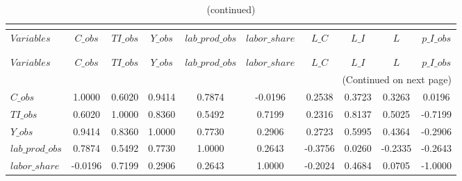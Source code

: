  
\begin{center}
\begin{longtable}{lccccccccc} 
\caption{MATRIX OF CORRELATIONS}\\
 \label{Table:th_corr_matrix}\\
\toprule 
$Variables       $	 & 	 $           C\_obs$	 & 	 $          TI\_obs$	 & 	 $           Y\_obs$	 & 	 $  lab\_prod\_obs$	 & 	 $     labor\_share$	 & 	 $             L\_C$	 & 	 $             L\_I$	 & 	 $                 L$	 & 	 $       p\_I\_obs$\\
\midrule \endfirsthead 
\caption{(continued)}\\
 \toprule \\ 
$Variables       $	 & 	 $           C\_obs$	 & 	 $          TI\_obs$	 & 	 $           Y\_obs$	 & 	 $  lab\_prod\_obs$	 & 	 $     labor\_share$	 & 	 $             L\_C$	 & 	 $             L\_I$	 & 	 $                 L$	 & 	 $       p\_I\_obs$\\
\midrule \endhead 
\midrule \multicolumn{10}{r}{(Continued on next page)} \\ \bottomrule \endfoot 
\bottomrule \endlastfoot 
$C\_obs          $	 & 	            1.0000	 & 	            0.6020	 & 	            0.9414	 & 	            0.7874	 & 	           -0.0196	 & 	            0.2538	 & 	            0.3723	 & 	            0.3263	 & 	            0.0196 \\ 
$TI\_obs         $	 & 	            0.6020	 & 	            1.0000	 & 	            0.8360	 & 	            0.5492	 & 	            0.7199	 & 	            0.2316	 & 	            0.8137	 & 	            0.5025	 & 	           -0.7199 \\ 
$Y\_obs          $	 & 	            0.9414	 & 	            0.8360	 & 	            1.0000	 & 	            0.7730	 & 	            0.2906	 & 	            0.2723	 & 	            0.5995	 & 	            0.4364	 & 	           -0.2906 \\ 
$lab\_prod\_obs  $	 & 	            0.7874	 & 	            0.5492	 & 	            0.7730	 & 	            1.0000	 & 	            0.2643	 & 	           -0.3756	 & 	            0.0260	 & 	           -0.2335	 & 	           -0.2643 \\ 
$labor\_share    $	 & 	           -0.0196	 & 	            0.7199	 & 	            0.2906	 & 	            0.2643	 & 	            1.0000	 & 	           -0.2024	 & 	            0.4684	 & 	            0.0705	 & 	           -1.0000 \\ 

\end{longtable}
\end{center}
